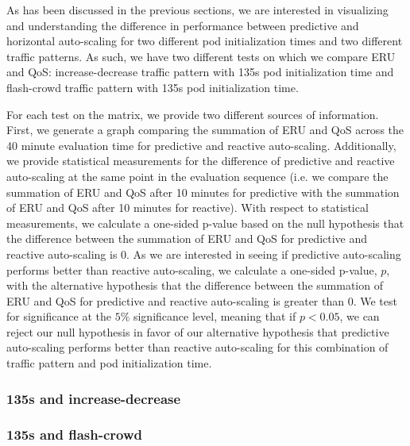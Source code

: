 As has been discussed in the previous sections, we are interested in visualizing
and understanding the difference in performance between predictive and
horizontal auto-scaling for two different pod initialization times and two
different traffic patterns. As such, we have two different tests on which we
compare ERU and QoS: increase-decrease traffic pattern with 135s pod
initialization time and flash-crowd traffic pattern with 135s pod initialization time.

For each test on the matrix, we provide two different sources of information.
First, we generate a graph comparing the summation of ERU and QoS across the 40
minute evaluation time for predictive and reactive auto-scaling. Additionally,
we provide statistical measurements for the difference of predictive and
reactive auto-scaling at the same point in the evaluation sequence (i.e. we
compare the summation of ERU and QoS after 10 minutes for predictive with the
summation of ERU and QoS after 10 minutes for reactive). With respect to
statistical measurements, we calculate a one-sided p-value
based on the null hypothesis that the difference
between the summation of ERU and QoS for predictive and reactive auto-scaling is
$0$. As we are interested in seeing if predictive auto-scaling performs better
than reactive auto-scaling, we calculate a one-sided p-value, $p$, with the alternative
hypothesis that the difference between the summation of ERU and QoS for
predictive and reactive auto-scaling is greater than $0$. We test for
significance at the $5\%$ significance level, meaning that if $p < 0.05$, we can
reject our null hypothesis in favor of our alternative hypothesis that
predictive auto-scaling performs better than reactive auto-scaling for this
combination of traffic pattern and pod initialization time.

\subsubsection{135s and increase-decrease}



\subsubsection{135s and flash-crowd}


